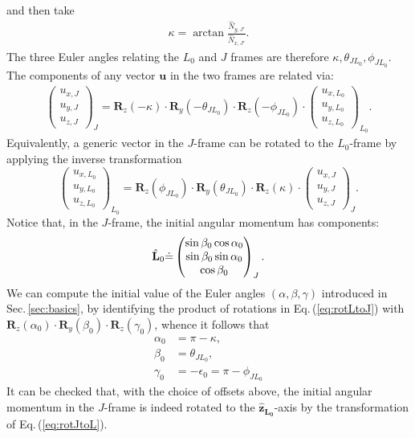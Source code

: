 \documentclass[%
aps,
prd,
amssymb,
amsmath,
amsfonts,
eqsecnum,
showpacs,
nofootinbib,
floatfix,
twocolumn,
twoside,
a4paper,
superscriptaddress
]{revtex4-1}
\newcommand{\z}{\mathbf{\hat{z}}}
\newcommand{\hLO}{{\hat{\bf{L}}}_0}
\newcommand{\LO}{\mathbf{L_0}}
\begin{document}
and then take
\begin{align}
\kappa=\arctan{\frac{\hat N_{y,J'}}{\hat N_{x,J'}}}.
\end{align}
The three Euler angles relating the $L_0$ and $J$ frames are therefore $\kappa,\theta_{JL_0},\phi_{JL_0}$. The components of any vector $\mathbf{u}$ in the two frames are related via: 
\begin{align}
\label{eq:rotLtoJ}
    \begin{pmatrix} u_{x,J}\\{u}_{y,J}\\{u}_{z,J}\end{pmatrix}_{J} =\mathbf{R}_{z}(-\kappa) \cdot \mathbf{R}_{y}(-\theta_{JL_0}) \cdot \mathbf{R}_{z}(-\phi_{JL_0}) \cdot  \begin{pmatrix} {u}_{x,L_0}\\{u}_{y,L_0}\\{u}_{z,L_0}\end{pmatrix}_{L_0}.
\end{align}
Equivalently, a generic vector in the $J$-frame can be rotated to the $L_0$-frame by applying the inverse transformation 
\begin{equation}
\label{eq:rotJtoL}
    \begin{pmatrix} {u}_{x,L_0}\\{u}_{y,L_0}\\{u}_{z,L_0}\end{pmatrix}_{L_0} =\mathbf{R}_{z}(\phi_{JL_0}) \cdot \mathbf{R}_{y}(\theta_{JL_0}) \cdot \mathbf{R}_{z}(\kappa) \cdot  \begin{pmatrix} u_{x,J}\\u_{y,J}\\u_{z,J}\end{pmatrix}_{J}.
\end{equation}
Notice that, in the $J$-frame, the initial angular momentum has components:
\begin{align}
\label{eq:L0inJ}
    \hLO \dot=  \begin{pmatrix} \sin \beta_0 \cos \alpha_0\\ \sin \beta_0 \sin \alpha_0\\ \cos \beta_0 \end{pmatrix}_{J}.
\end{align}
We can compute the initial value of the Euler angles $(\alpha,\beta,\gamma)$ introduced in Sec.\,\ref{sec:basics}, by identifying the product of rotations in Eq.\,(\ref{eq:rotLtoJ}) with $\mathbf{R}_z(\alpha_0) \cdot \mathbf{R}_y(\beta_0) \cdot \mathbf{R}_z(\gamma_0)$, whence it follows that
\begin{subequations}
\label{eq:def_alpha_epsilon_0}
\begin{align}
\alpha_0&=\pi-\kappa,\\
\beta_0&=\theta_{JL_0},\\
\gamma_0&=-\epsilon_0=\pi-\phi_{JL_0}
\end{align}
\end{subequations}
It can be checked that, with the choice of offsets above, the initial angular momentum in the $J$-frame is indeed rotated to the $\z_{\LO}$-axis by the transformation of Eq.\,(\ref{eq:rotJtoL}). 
\end{document}
